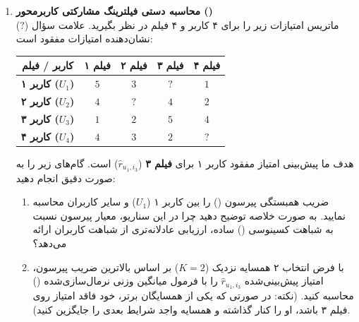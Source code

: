 \documentclass[a4paper,12pt]{article}
\begin{document}
\begin{enumerate}

\item \textbf{محاسبه دستی فیلترینگ مشارکتی کاربر‌محور ()}
\\
ماتریس امتیازات زیر را برای ۴ کاربر و ۴ فیلم در نظر بگیرید. علامت سؤال ($?$) نشان‌دهنده امتیازات مفقود است:

\begin{table}[h!]
\centering
\begin{tabular}{ccccc}
\toprule
\textbf{کاربر / فیلم} & \textbf{فیلم ۱} & \textbf{فیلم ۲} & \textbf{فیلم ۳} & \textbf{فیلم ۴} \\
\midrule
\textbf{کاربر ۱ ($U_1$)} & $5$ & $3$ & $?$ & $1$ \\
\textbf{کاربر ۲ ($U_2$)} & $4$ & $?$ & $4$ & $2$ \\
\textbf{کاربر ۳ ($U_3$)} & $1$ & $2$ & $5$ & $4$ \\
\textbf{کاربر ۴ ($U_4$)} & $4$ & $3$ & $2$ & $?$ \\
\bottomrule
\end{tabular}
\end{table}

هدف ما پیش‌بینی امتیاز مفقود کاربر ۱ برای \textbf{فیلم ۳} ($\hat{r}_{u_1, i_3}$) است. گام‌های زیر را به صورت دقیق انجام دهید:
\begin{enumerate}
    \item ضریب همبستگی پیرسون () را بین کاربر ۱ ($U_1$) و سایر کاربران محاسبه نمایید. به صورت خلاصه توضیح دهید چرا در این سناریو، معیار پیرسون نسبت به شباهت کسینوسی () ساده، ارزیابی عادلانه‌تری از شباهت کاربران ارائه می‌دهد؟ 
    \item با فرض انتخاب ۲ همسایه نزدیک ($K=2$) بر اساس بالاترین ضریب پیرسون، امتیاز پیش‌بینی‌شده $\hat{r}_{u_1, i_3}$ را با فرمول میانگین وزنی نرمال‌سازی‌شده () محاسبه کنید. (نکته: در صورتی که یکی از همسایگان برتر، خود فاقد امتیاز روی فیلم ۳ باشد، او را کنار گذاشته و همسایه واجد شرایط بعدی را جایگزین کنید).
\end{enumerate}


\end{enumerate}
\end{document}
